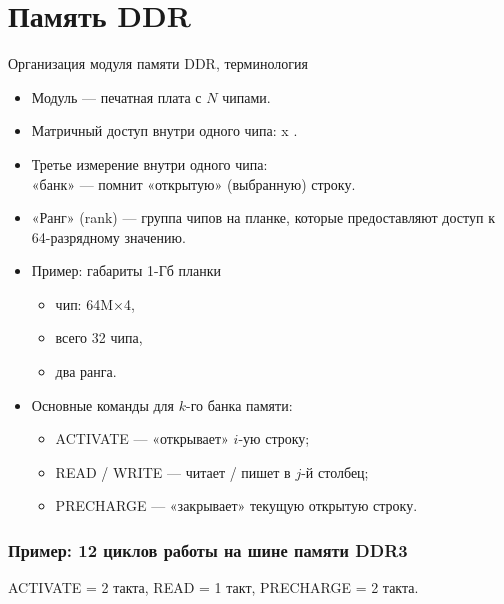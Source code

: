 \section{Память DDR}
\begin{frame}{Организация модуля памяти DDR, терминология}
\pause
\begin{itemize}%
    \item Модуль — печатная плата с $N$ чипами.

    \pause\item Матричный доступ внутри одного чипа: {\color{red}  x }.

    \pause\item Третье измерение внутри одного чипа:\\ «{\color{red}банк}»  — помнит «открытую» (выбранную) строку.

    \pause\item «Ранг» (rank) — группа чипов на планке, которые предоставляют доступ к 64-разрядному значению.


    \pause\item Пример: габариты 1-Гб планки
    \begin{itemize}
        \item чип: 64M×4,
        \item всего 32 чипа,
        \item два ранга.
    \end{itemize}


    \pause\item Основные команды для $k$-го банка памяти:
    \begin{itemize}
        \item ACTIVATE — «открывает» $i$-ую строку;
        \item READ / WRITE — читает / пишет в $j$-й столбец;
        \item PRECHARGE — «закрывает» текущую открытую строку.
    \end{itemize}
\end{itemize}
\end{frame}

\begin{frame}
\frametitle{Пример: 12 циклов работы на шине памяти DDR3}
ACTIVATE = 2 такта, \hfill READ = 1 такт, \hfill PRECHARGE = 2 такта.
\end{frame}



